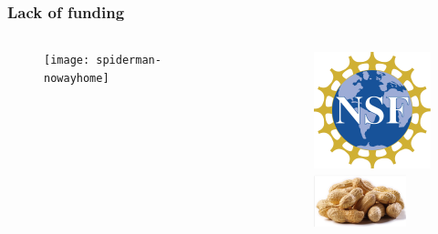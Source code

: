 \documentclass[hide notes,intlimits]{beamer}
\begin{document}
\begin{frame}
 \frametitle{Lack of funding}
  \begin{columns}[c]
    \begin{column}{.5\linewidth}
      \begin{figure}
        \texttt{[image: spiderman-nowayhome]}
      \end{figure}
    \end{column}
    \begin{column}{.5\linewidth}
      \begin{figure}
        \includegraphics[height=3.5cm]{nsf_logo_color} \\[0.25em]
        \includegraphics[height=1.5cm]{peanuts} 
      \end{figure}
    \end{column}
  \end{columns}
  \vspace{1em}
\end{frame}
\end{document}
